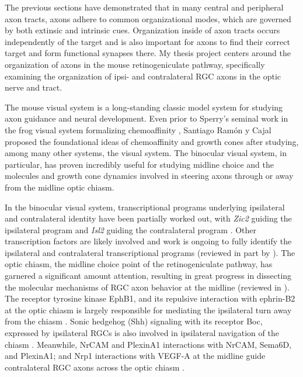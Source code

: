 The previous sections have demonstrated that in many central and peripheral axon tracts, axons adhere to common organizational modes, which are governed by both extinsic and intrinsic cues.
Organization inside of axon tracts occurs independently of the target and is also important for axons to find their correct target and form functional synapses there.
My thesis project centers around the organization of axons in the mouse retinogeniculate pathway, specifically examining the organization of ipsi- and contralateral RGC axons in the optic nerve and tract.

The mouse visual system is a long-standing classic model system for studying axon guidance and neural development.
Even prior to Sperry's seminal work in the frog visual system formalizing chemoaffinity \cite{sperry1963chemoaffinity}, Santiago Ram\'on y Cajal proposed the foundational ideas of chemoaffinity and growth cones after studying, among many other systems, the visual system.
The binocular visual system, in particular, has proven incredibly useful for studying midline choice and the molecules and growth cone dynamics involved in steering axons through or away from the midline optic chiasm.

In the binocular visual system, transcriptional programs underlying ipsilateral and contralateral identity have been partially worked out, with \emph{Zic2} guiding the ipsilateral program and \emph{Isl2} guiding the contralateral program \cite{herrera2003zic2,pak2004magnitude,garcia2008zic2}.
Other transcription factors are likely involved and work is ongoing to fully identify the ipsilateral and contralateral transcriptional programs (reviewed in part by ).
The optic chiasm, the midline choice point of the retinogeniculate pathway, has garnered a significant amount attention, resulting in great progress in dissecting the molecular mechanisms of RGC axon behavior at the midline (reviewed in ).
The receptor tyrosine kinase EphB1, and its repulsive interaction with ephrin-B2 at the optic chiasm is largely responsible for mediating the ipsilateral turn away from the chiasm \cite{nakagawa2000ephrin,williams2003ephrin,petros2009specificity}.
Sonic hedgehog (Shh) signaling with its receptor Boc, expressed by ipsilateral RGCs is also involved in ipsilateral navigation of the chiasm \cite{fabre2010segregation}.
Meanwhile, NrCAM and PlexinA1 interactions with NrCAM, Sema6D, and PlexinA1; and Nrp1 interactions with VEGF-A at the midline guide contralateral RGC axons across the optic chiasm \cite{williams2006role,erskine2011vegf,kuwajima2012optic}.

